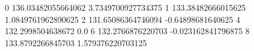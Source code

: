 0 136.03482055664062 3.7349700927734375
1 133.38482666015625 1.0849761962890625
2 131.65086364746094 -0.64898681640625
4 132.2998504638672 0.0
6 132.2766876220703 -0.023162841796875
8 133.8792266845703 1.579376220703125
